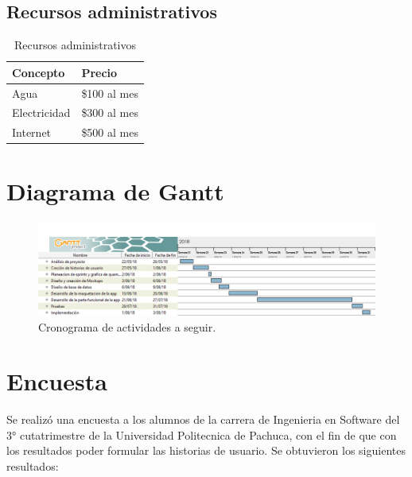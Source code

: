 \subsection{Recursos administrativos}
\begin{table}[H]
\centering
\begin{tabular}{|l|l|}
\hline
Concepto     & Precio       \\ \hline
Agua         & \$100 al mes \\ \hline
Electricidad & \$300 al mes \\ \hline
Internet     & \$500 al mes \\ \hline
\end{tabular}
\caption{Recursos administrativos}
\label{administrativos}
\end{table}

\section{Diagrama de Gantt}
\begin{figure}[H]
	\begin{center}
		\includegraphics[scale=0.6]{img/cronograma.png} 
		\caption{Cronograma de actividades a seguir.}
		\label{gantt}
	\end{center}
\end{figure}

\section{Encuesta}
Se realizó una encuesta a los alumnos de la carrera de Ingenieria en Software del 3° cutatrimestre de la Universidad Politecnica de Pachuca, con el fin de que con los resultados poder formular las historias de usuario. Se obtuvieron los siguientes resultados:

